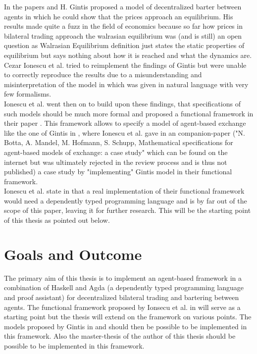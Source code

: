 \documentclass{article}
\begin{document}
In the papers \cite{Gintis2006} and \cite{gintis_dynamics_2007} H. Gintis proposed a model of decentralized barter between agents in which he could show that the prices approach an equilibrium. His results made quite a fuzz in the field of economics because so far how prices in bilateral trading approach the walrasian equilibrium was (and is still) an open question as Walrasian Equilibrium definition just states the static properties of equilibrium but says nothing about how it is reached and what the dynamics are. \\
Cezar Ionescu et al. tried to reimplement the findings of Gintis but were unable to correctly reproduce the results due to a misunderstanding and misinterpretation of the model in \cite{Gintis2006} which was given in natural language with very few formalisms. \\
Ionescu et al. went then on to build upon these findings, that specifications of such models should be much more formal and proposed a functional framework in their paper \cite{Botta20114025}. This framework allows to specify a model of agent-based exchange like the one of Gintis in \cite{Gintis2006}, where Ionescu et al. gave in an companion-paper ("N. Botta, A. Mandel, M. Hofmann, S. Schupp, Mathematical specifications for agent-based models of exchange: a case study" which can be found on the internet but was ultimately rejected in the review process and is thus not published) a case study by "implementing" Gintis model in their functional framework. \\
Ionescu et al. state in \cite{Botta20114025} that a real implementation of their functional framework would need a dependently typed programming language and is by far out of the scope of this paper, leaving it for further research. This will be the starting point of this thesis as pointed out below.\\

\section{Goals and Outcome}
The primary aim of this thesis is to implement an agent-based framework in a combination of Haskell and Agda (a dependently typed programming language and proof assistant) for decentralized bilateral trading and bartering between agents. The functional framework proposed by Ionsecu et al. in \cite{Botta20114025} will serve as a starting point but the thesis will extend on the framework on various points. The models proposed by Gintis in \cite{Gintis2006} and \cite{gintis_dynamics_2007}  should then be possible to be implemented in this framework. Also the master-thesis of the author of this thesis should be possible to be implemented in this framework.
\end{document}
